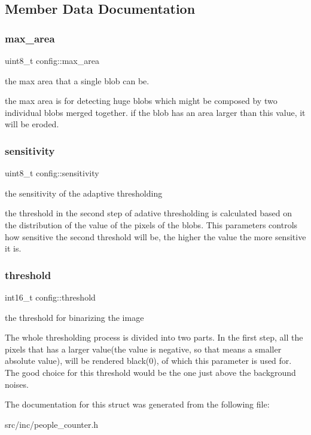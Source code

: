 \subsection{Member Data Documentation}
\mbox{\label{structconfig_a7b01db4f29befbf3cc2925748fa3014a}} 
\subsubsection{\texorpdfstring{max\_area}{max\_area}}
{\footnotesize\ttfamily uint8\+\_\+t config\+::max\+\_\+area}



the max area that a single blob can be. 

the max area is for detecting huge blobs which might be composed by two individual blobs merged together. if the blob has an area larger than this value, it will be eroded. \mbox{\label{structconfig_a91f6a75cc3ae6447712700387e89a9c2}} 
\subsubsection{\texorpdfstring{sensitivity}{sensitivity}}
{\footnotesize\ttfamily uint8\+\_\+t config\+::sensitivity}



the sensitivity of the adaptive thresholding 

the threshold in the second step of adative thresholding is calculated based on the distribution of the value of the pixels of the blobs. This parameters controls how sensitive the second threshold will be, the higher the value the more sensitive it is. \mbox{\label{structconfig_ae0c9e09ec87f1a408ec356df5f468118}} 
\subsubsection{\texorpdfstring{threshold}{threshold}}
{\footnotesize\ttfamily int16\+\_\+t config\+::threshold}



the threshold for binarizing the image 

The whole thresholding process is divided into two parts. In the first step, all the pixels that has a larger value(the value is negative, so that means a smaller absolute value), will be rendered black(0), of which this parameter is used for. The good choice for this threshold would be the one just above the background noises. 

The documentation for this struct was generated from the following file\+:\begin{DoxyCompactItemize}
\item 
src/inc/people\+\_\+counter.\+h\end{DoxyCompactItemize}
